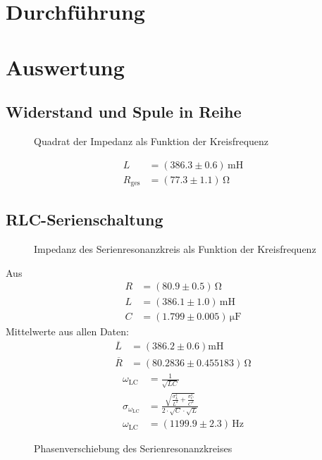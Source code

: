 \documentclass[12pt,a4paper,titlepage,headinclude,bibtotoc]{scrartcl}
\begin{document}
\section{Durchführung}
\label{sec:durchfuehrung}


\section{Auswertung}
\label{sec:auswertung}
\subsection{Widerstand und Spule in Reihe}
\begin{figure}[!htb]
	\centering
	
	\caption{Quadrat der Impedanz als Funktion der Kreisfrequenz}
	\label{fig:messung1}
\end{figure}

\begin{align}
	L&=(386.3\pm 0.6)\,\si{\milli\henry}\\
	R_\text{ges}&=(77.3 \pm 1.1)\,\si{\ohm}
\end{align}
\subsection{RLC-Serienschaltung}
\begin{figure}[!htb]
	\centering
	
	\caption{Impedanz des Serienresonanzkreis als Funktion der Kreisfrequenz}
	\label{fig:messung2}
\end{figure}
Aus
\begin{align}
	R &= (80.9 \pm 0.5)\,\si{\ohm}\\
	L &= (386.1 \pm 1.0)\,\si{\milli\henry}\\
	C &= (1.799 \pm 0.005)\,\si{\micro\farad}
\end{align}
Mittelwerte aus allen Daten:
\begin{align}
\overline L&=(386.2 \pm 0.6)\si{\milli\henry}\\
\overline R&=(80.2836 \pm 0.455183)\,\si{\ohm}
\end{align}
\begin{align}
\omega_\text{LC}&=\frac{1}{\sqrt{LC}}\\
\sigma_{\omega_\text{LC}}&=\frac{\sqrt{\frac{\sigma_{L}^{2}}{L^{2}} + \frac{\sigma_{C}^{2}}{C^{2}}}}{2 \cdot \sqrt{C} \cdot \sqrt{L}}\\
\omega_\text{LC}&=(1199.9 \pm 2.3)\,\si{\hertz}
\end{align}
\begin{figure}[!htb]
	\centering
	
	\caption{Phasenverschiebung des Serienresonanzkreises}
	\label{fig:phase}
\end{figure}
\end{document}

